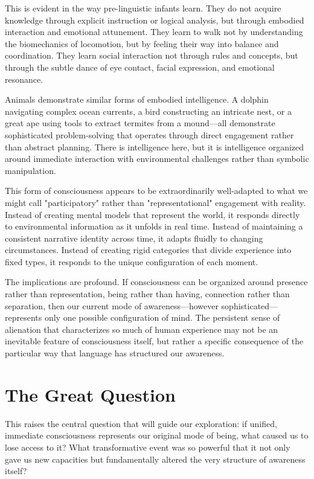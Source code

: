 This is evident in the way pre-linguistic infants learn. They do not acquire knowledge through explicit instruction or logical analysis, but through embodied interaction and emotional attunement. They learn to walk not by understanding the biomechanics of locomotion, but by feeling their way into balance and coordination. They learn social interaction not through rules and concepts, but through the subtle dance of eye contact, facial expression, and emotional resonance.

Animals demonstrate similar forms of embodied intelligence. A dolphin navigating complex ocean currents, a bird constructing an intricate nest, or a great ape using tools to extract termites from a mound—all demonstrate sophisticated problem-solving that operates through direct engagement rather than abstract planning. There is intelligence here, but it is intelligence organized around immediate interaction with environmental challenges rather than symbolic manipulation.

This form of consciousness appears to be extraordinarily well-adapted to what we might call "participatory" rather than "representational" engagement with reality. Instead of creating mental models that represent the world, it responds directly to environmental information as it unfolds in real time. Instead of maintaining a consistent narrative identity across time, it adapts fluidly to changing circumstances. Instead of creating rigid categories that divide experience into fixed types, it responds to the unique configuration of each moment.

The implications are profound. If consciousness can be organized around presence rather than representation, being rather than having, connection rather than separation, then our current mode of awareness—however sophisticated—represents only one possible configuration of mind. The persistent sense of alienation that characterizes so much of human experience may not be an inevitable feature of consciousness itself, but rather a specific consequence of the particular way that language has structured our awareness.

\section{The Great Question}

This raises the central question that will guide our exploration: if unified, immediate consciousness represents our original mode of being, what caused us to lose access to it? What transformative event was so powerful that it not only gave us new capacities but fundamentally altered the very structure of awareness itself?

